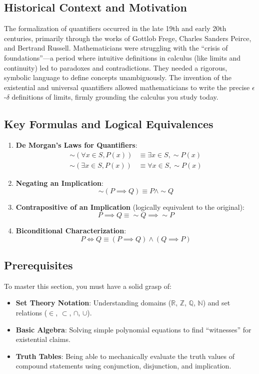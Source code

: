 \documentclass[12pt]{article}
\begin{document}
\subsection{Historical Context and Motivation}
The formalization of quantifiers occurred in the late 19th and early 20th centuries, primarily through the works of Gottlob Frege, Charles Sanders Peirce, and Bertrand Russell. Mathematicians were struggling with the ``crisis of foundations''---a period where intuitive definitions in calculus (like limits and continuity) led to paradoxes and contradictions. They needed a rigorous, symbolic language to define concepts unambiguously. The invention of the existential and universal quantifiers allowed mathematicians to write the precise $\epsilon$-$\delta$ definitions of limits, firmly grounding the calculus you study today.

\subsection{Key Formulas and Logical Equivalences}
\begin{enumerate}
    \item \textbf{De Morgan's Laws for Quantifiers}:
    \begin{align*}
        \sim(\forall x \in S, P(x)) &\equiv \exists x \in S, \sim P(x) \\
        \sim(\exists x \in S, P(x)) &\equiv \forall x \in S, \sim P(x)
    \end{align*}
    \item \textbf{Negating an Implication}:
    \[ \sim(P \implies Q) \equiv P \land \sim Q \]
    \item \textbf{Contrapositive of an Implication} (logically equivalent to the original):
    \[ P \implies Q \equiv \sim Q \implies \sim P \]
    \item \textbf{Biconditional Characterization}:
    \[ P \iff Q \equiv (P \implies Q) \land (Q \implies P) \]
\end{enumerate}

\subsection{Prerequisites}
To master this section, you must have a solid grasp of:
\begin{itemize}
    \item \textbf{Set Theory Notation}: Understanding domains ($\mathbb{R}$, $\mathbb{Z}$, $\mathbb{Q}$, $\mathbb{N}$) and set relations ($\in$, $\subset$, $\cap$, $\cup$).
    \item \textbf{Basic Algebra}: Solving simple polynomial equations to find ``witnesses'' for existential claims.
    \item \textbf{Truth Tables}: Being able to mechanically evaluate the truth values of compound statements using conjunction, disjunction, and implication.
\end{itemize}
\end{document}
